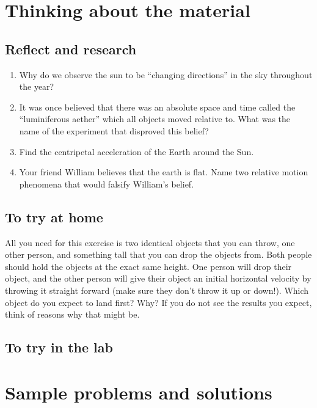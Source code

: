 \newpage
\section{Thinking about the material}
\subsection{Reflect and research}

\begin{enumerate}
\item Why do we observe the sun to be ``changing directions'' in the sky throughout the year?
\item It was once believed that there was an absolute space and time called the ``luminiferous aether'' which all objects moved relative to. What was the name of the experiment that disproved this belief?
\item Find the centripetal acceleration of the Earth around the Sun.
\item Your friend William believes that the earth is flat. Name two relative motion phenomena that would falsify William's belief.
\end{enumerate}
\subsection{To try at home}

\begin{tQuestion}All you need for this exercise is two identical objects that you can throw, one other person, and something tall that you can drop the objects from. Both people should hold the objects at the exact same height. One person will drop their object, and the other person will give their object an initial horizontal velocity by throwing it straight forward (make sure they don't throw it up or down!). Which object do you expect to land first? Why? If you do not see the results you expect, think of reasons why that might be. \end{tQuestion}

\subsection{To try in the lab}

\newpage
\section{Sample problems and solutions}
